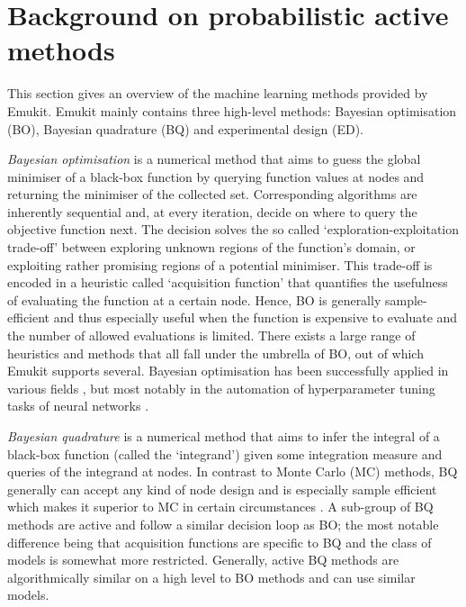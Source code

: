 \section{Background on probabilistic active methods}\label{sec:background}


This section gives an overview of the machine learning methods provided by Emukit.
Emukit mainly contains three high-level methods: Bayesian optimisation (BO), Bayesian quadrature (BQ) and experimental design (ED).

\emph{Bayesian optimisation} \cite{Mockus1978, Garnett2023} is a numerical method that aims to guess the global minimiser of a black-box function by querying function values at nodes and returning the minimiser of the collected set. Corresponding algorithms are inherently sequential and, at every iteration, decide on where to query the objective function next. The decision solves the so called `exploration-exploitation trade-off' between exploring unknown regions of the function's domain, or exploiting rather promising regions of a potential minimiser. This trade-off is encoded in a heuristic called `acquisition function' that quantifies the usefulness of evaluating the function at a certain node. Hence, BO is generally sample-efficient and thus especially useful when the function is expensive to evaluate and the number of allowed evaluations is limited. There exists a large range of heuristics and methods that all fall under the umbrella of BO, out of which Emukit supports several. Bayesian optimisation has been successfully applied in various fields \cite{baheri2017altitude, graff2021accelerating}, but most notably in the automation of hyperparameter tuning tasks of neural networks \cite{snoek2012practical, avent2020automatic}.

\emph{Bayesian quadrature} \cite{Diaconis1988, OHagan1992, pnbook22} is a numerical method that aims to infer the integral of a black-box function (called the `integrand') given some integration measure and queries of the integrand at nodes. In contrast to Monte Carlo (MC) methods, BQ generally can accept any kind of node design and is especially sample efficient which makes it superior to MC in certain circumstances \cite{RasmussenGhahramani2002}. A sub-group of BQ methods are active and follow a similar decision loop as BO; the most notable difference being that acquisition functions are specific to BQ and the class of models is somewhat more restricted. Generally, active BQ methods are algorithmically similar on a high level to BO methods and can use similar models.

